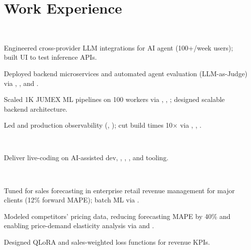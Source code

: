 \documentclass{tex/deedy-resume-openfont}
\begin{document}
\hfill
\begin{minipage}[t]{0.67\textwidth} 


\section{Work Experience}
\\
\vspace{\topsep}
\begin{tightemize}
    \item Engineered cross-provider LLM integrations for AI agent (100+/week users); built  UI to test  inference APIs.
    \item Deployed backend microservices and automated agent evaluation (LLM-as-Judge) via , , and .
    \item Scaled 1K JUMEX ML pipelines on 100  workers via , , ; designed scalable backend architecture.
    \item Led  and production observability (, ); cut build times 10$\times$ via , , .
\end{tightemize}
\sectionsep

\\
\begin{tightemize}
    \item Deliver live-coding on AI-assisted dev, , , , and tooling.
\end{tightemize}
\sectionsep

\\
\begin{tightemize}
    \item Tuned   for sales forecasting in enterprise retail revenue management for major clients (12\% forward MAPE);  batch ML via .
    \item Modeled competitors' pricing data, reducing forecasting MAPE by 40\% and enabling price-demand elasticity analysis via  and .
    \item Designed QLoRA and sales-weighted loss functions for revenue KPIs.
\end{tightemize}
\sectionsep


\end{minipage}
\end{document}
